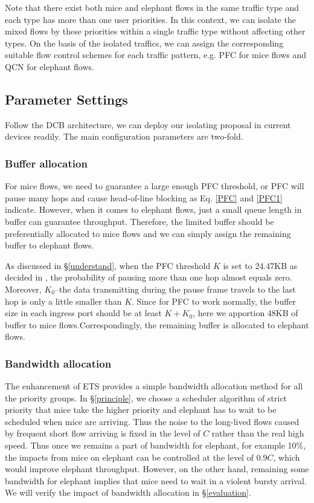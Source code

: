 \documentclass[]{sig-alternate-10pt}
\begin{document}
Note that there exist both mice and elephant flows in the same traffic type and each type has more than one user priorities. In this context, we can isolate the mixed flows by these priorities within a single traffic type without affecting other types. On the basis of the isolated traffics, we can assign the corresponding suitable flow control schemes for each traffic pattern, e.g. PFC for mice flows and QCN for elephant flows.


\subsection{Parameter Settings}
Follow the DCB architecture, we can deploy our isolating proposal in current devices readily.
The main configuration parameters are two-fold.
\subsubsection{Buffer allocation }
For mice flows, we need to guarantee a large enough PFC threshold, or PFC will pause many hops and cause head-of-line blocking as Eq. \ref{PFC} and \ref{PFC1} indicate. However, when it comes to elephant flows, just a small queue length in buffer can guarantee throughput. Therefore, the limited buffer should be preferentially allocated to mice flows and we can simply assign the remaining buffer to elephant flows.

As discussed in \S\ref{understand}, when the PFC threshold $K$ is set to 24.47KB as decided in \cite{zhu2015congestion}, the probability of pausing more than one hop almost equals zero. Moreover, $K_0$--the data transmitting during the pause frame travels to the last hop is only a little smaller than $K$. Since for PFC to work normally, the buffer size in each ingress port should be at least $K+K_0$, here we apportion 48KB of buffer to mice flows.Correspondingly, the remaining buffer is allocated to elephant flows.

	


\subsubsection{Bandwidth allocation} 

The enhancement of ETS provides a simple bandwidth allocation method for all the priority groups.
In \S\ref{principle}, we choose a scheduler algorithm of strict priority   that mice take the higher priority and elephant has to wait to be scheduled when mice are arriving.
Thus the noise to the long-lived flows caused by frequent short flow arriving is fixed in the level of $C$ rather than the real high speed.
Thus once we remains a part of bandwidth for elephant, for example 10\%, the impacts from mice on elephant can be controlled at the level of $0.9C$, which would improve elephant throughput.
However, on the other hand, remaining some bandwidth for elephant implies that mice need to wait in a violent bursty arrival. 
We will verify the impact of bandwidth allocation in \S\ref{evaluation}.
\end{document}
